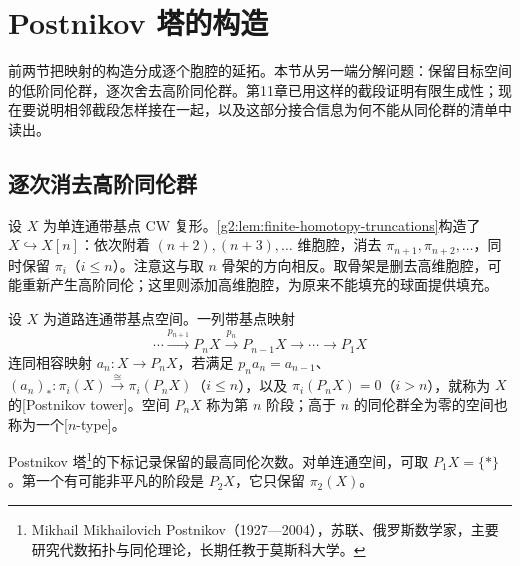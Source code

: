 
% 
% 

\section{Postnikov 塔的构造}
\label{g2:sec:1203}

前两节把映射的构造分成逐个胞腔的延拓。本节从另一端分解问题：保留目标空间的低阶同伦群，逐次舍去高阶同伦群。第11章已用这样的截段证明有限生成性；现在要说明相邻截段怎样接在一起，以及这部分接合信息为何不能从同伦群的清单中读出。

\subsection{逐次消去高阶同伦群}
\label{g2:subsec:1203:01}

设 \(X\) 为单连通带基点 CW 复形。\cref{g2:lem:finite-homotopy-truncations}构造了 \(X\hookrightarrow X[n]\)：依次附着 \((n+2),(n+3),\ldots\) 维胞腔，消去 \(\pi_{n+1},\pi_{n+2},\ldots\)，同时保留 \(\pi_i\)（\(i\le n\)）。注意这与取 \(n\) 骨架的方向相反。取骨架是删去高维胞腔，可能重新产生高阶同伦；这里则添加高维胞腔，为原来不能填充的球面提供填充。

\begin{definition}[Postnikov 塔]\label{g2:def:postnikov-tower}
	设 \(X\) 为道路连通带基点空间。一列带基点映射
	\[
		\cdots\xrightarrow{p_{n+1}}P_nX\xrightarrow{p_n}P_{n-1}X\longrightarrow\cdots\longrightarrow P_1X
	\]
	连同相容映射 \(a_n:X\to P_nX\)，若满足 \(p_na_n=a_{n-1}\)、\((a_n)_*:\pi_i(X)\xrightarrow{\cong}\pi_i(P_nX)\)（\(i\le n\)），以及 \(\pi_i(P_nX)=0\)（\(i>n\)），就称为 \(X\) 的[Postnikov tower]。空间 \(P_nX\) 称为第 \(n\) 阶段；高于 \(n\) 的同伦群全为零的空间也称为一个[\(n\)-type]。
\end{definition}

Postnikov 塔\footnote{Mikhail Mikhailovich Postnikov（1927—2004），苏联、俄罗斯数学家，主要研究代数拓扑与同伦理论，长期任教于莫斯科大学。}的下标记录保留的最高同伦次数。对单连通空间，可取 \(P_1X=\{*\}\)。第一个有可能非平凡的阶段是 \(P_2X\)，它只保留 \(\pi_2(X)\)。

